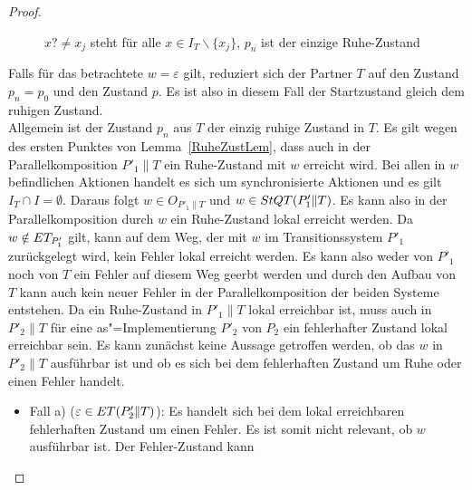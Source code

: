 \begin{proof}
\begin{figure} [h!tbp]
\begin{center}
    \caption{$x?\neq x_j$ steht für alle $x\in I_T\backslash\{x_j\}$, $p_n$
    ist der einzige Ruhe-Zustand}
  \label{TohneEmitI}
  \end{center}
  \end{figure}
  Falls für das betrachtete $w=\varepsilon$ gilt, reduziert sich der Partner
  $T$ auf den Zustand $p_n=p_0$ und den Zustand $p$. Es ist also in diesem Fall
  der Startzustand gleich dem ruhigen Zustand.\\
  Allgemein ist der Zustand $p_n$ aus $T$ der einzig ruhige Zustand in $T$. Es
  gilt wegen des ersten Punktes von Lemma~\ref{RuheZustLem}, dass auch in der
  Parallelkomposition $P'_1\|T$ ein Ruhe-Zustand mit $w$ erreicht wird. Bei
  allen in $w$ befindlichen Aktionen handelt es sich um synchronisierte
  Aktionen und es gilt $I_T\cap I=\emptyset$. Daraus folgt $w\in O_{P'_1\|T}$
  und $w\in StQT (P'_1\|T)$. Es kann also in der Parallelkomposition durch $w$
  ein Ruhe-Zustand lokal erreicht werden. Da $w\notin ET _{P'_1}$ gilt, kann
  auf dem Weg, der mit $w$ im Transitionssystem $P'_1$ zurückgelegt wird, kein
  Fehler lokal erreicht werden. Es kann also weder von $P'_1$ noch von $T$ ein
  Fehler auf diesem Weg geerbt werden und durch den Aufbau von $T$ kann auch
  kein neuer Fehler in der Parallelkomposition der beiden Systeme entstehen. Da
  ein Ruhe-Zustand in $P'_1\|T$ lokal erreichbar ist, muss auch in $P'_2\|T$
  für eine as"=Implementierung $P'_2$ von $P_2$ ein \glqq fehlerhafter
  Zustand\grqq{} lokal erreichbar sein. Es kann zunächst keine Aussage
  getroffen werden, ob das $w$ in $P'_2\|T$ ausführbar ist und ob es sich bei
  dem \glqq fehlerhaften Zustand\grqq{} um Ruhe oder einen Fehler handelt.
  \begin{itemize}
    \item Fall a) ($\varepsilon\in ET (P'_2\|T)$): Es handelt sich bei dem
      lokal erreichbaren \glqq fehlerhaften Zustand\grqq{} um einen Fehler. Es
      ist somit nicht relevant, ob $w$ ausführbar ist. Der Fehler-Zustand kann

\end{itemize}
\end{proof}
